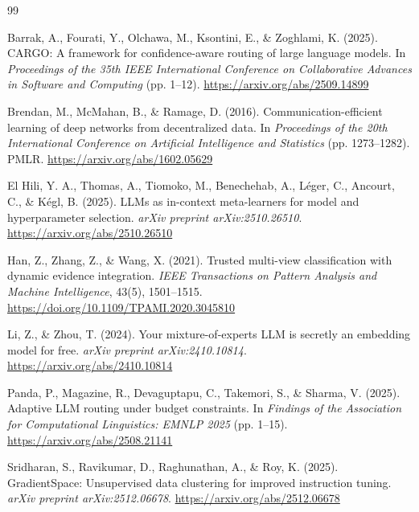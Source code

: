 \documentclass[11pt]{article}
\begin{document}

\begin{thebibliography}{99}

Barrak, A., Fourati, Y., Olchawa, M., Ksontini, E., \& Zoghlami, K. (2025).
\newblock CARGO: A framework for confidence-aware routing of large language models.
\newblock In \textit{Proceedings of the 35th IEEE International Conference on Collaborative Advances in Software and Computing} (pp. 1--12).
\newblock \url{https://arxiv.org/abs/2509.14899}

Brendan, M., McMahan, B., \& Ramage, D. (2016).
\newblock Communication-efficient learning of deep networks from decentralized data.
\newblock In \textit{Proceedings of the 20th International Conference on Artificial Intelligence and Statistics} (pp. 1273--1282). PMLR.
\newblock \url{https://arxiv.org/abs/1602.05629}

El Hili, Y. A., Thomas, A., Tiomoko, M., Benechehab, A., L\'eger, C., Ancourt, C., \& K\'egl, B. (2025).
\newblock LLMs as in-context meta-learners for model and hyperparameter selection.
\newblock \textit{arXiv preprint arXiv:2510.26510}.
\newblock \url{https://arxiv.org/abs/2510.26510}

Han, Z., Zhang, Z., \& Wang, X. (2021).
\newblock Trusted multi-view classification with dynamic evidence integration.
\newblock \textit{IEEE Transactions on Pattern Analysis and Machine Intelligence}, 43(5), 1501--1515.
\newblock \url{https://doi.org/10.1109/TPAMI.2020.3045810}

Li, Z., \& Zhou, T. (2024).
\newblock Your mixture-of-experts LLM is secretly an embedding model for free.
\newblock \textit{arXiv preprint arXiv:2410.10814}.
\newblock \url{https://arxiv.org/abs/2410.10814}

Panda, P., Magazine, R., Devaguptapu, C., Takemori, S., \& Sharma, V. (2025).
\newblock Adaptive LLM routing under budget constraints.
\newblock In \textit{Findings of the Association for Computational Linguistics: EMNLP 2025} (pp. 1--15).
\newblock \url{https://arxiv.org/abs/2508.21141}

Sridharan, S., Ravikumar, D., Raghunathan, A., \& Roy, K. (2025).
\newblock GradientSpace: Unsupervised data clustering for improved instruction tuning.
\newblock \textit{arXiv preprint arXiv:2512.06678}.
\newblock \url{https://arxiv.org/abs/2512.06678}


\end{thebibliography}
\end{document}
